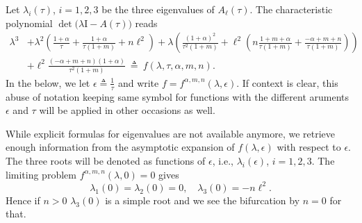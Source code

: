 \documentclass[a4paper,11pt]{article}
\def\l{{\ell}}
\theoremstyle{remark}
\begin{document}
Let $\lambda_i(\tau)$, $i=1,2,3$ be the three eigenvalues of $A_\ell(\tau)$. %
The characteristic polynomial $\det\big(\lambda \textrm{I} - A(\tau)\big)$ reads
\begin{equation}
\begin{aligned}
 \lambda^3 &+ \lambda^2\left( \tfrac{1+\alpha}{\tau} + \tfrac{1+\alpha}{\tau(1+m)} + n\l^2\right)
 + \lambda\left( \tfrac{(1+\alpha)^2}{\tau^2(1+m)}
 + \l^2\left( n\tfrac{1+m+\alpha}{\tau(1+m)} + \tfrac{-\alpha+m+n}{\tau(1+m)}\right)\right) \\
 &+ \l^2\tfrac{(-\alpha+m+n)(1+\alpha)}{\tau^2(1+m)} \: \triangleq \: f(\lambda,\tau,\alpha,m,n). \label{eq:poly}
\end{aligned}
\end{equation}
In the below, we let $\epsilon\triangleq \frac{1}{\tau}$ and write $f = f^{\alpha,m,n}(\lambda,\epsilon)$. If context is clear, this abuse of notation keeping same symbol for functions with the different aruments $\epsilon$ and $\tau$ will be applied in other occasions as well.

While explicit formulas for eigenvalues are not available anymore, we retrieve enough information from the asymptotic expansion of $f(\lambda,\epsilon)$ with respect to $\epsilon$. The three roots will be denoted as functions of $\epsilon$, i.e., $\lambda_i(\epsilon)$, $i=1,2,3$. The limiting problem $f^{\alpha,m,n}(\lambda,0)=0$ gives
$$ \lambda_1(0)=\lambda_2(0)=0, \quad \lambda_3(0) = -n\l^2.$$
Hence if $n>0$ $\lambda_3(0)$ is a simple root and we see the bifurcation by $n=0$ for that.
\end{document}
